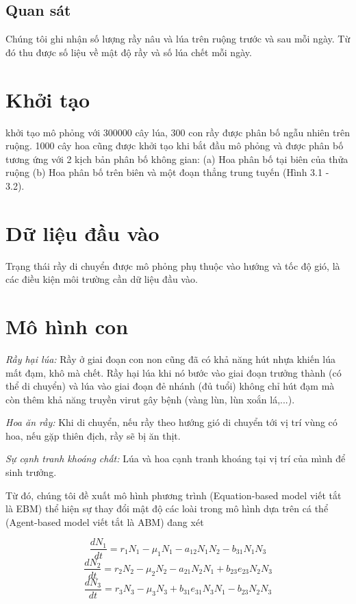 \documentclass[13pt]{extreport}
\begin{document}
{\subsection{Quan sát}
Chúng tôi ghi nhận số lượng rầy nâu và lúa trên ruộng trước và sau mỗi ngày. Từ đó thu được số liệu về mật độ rầy và số lúa chết mỗi ngày.

\section{Khởi tạo}
khởi tạo mô phỏng với 300000 cây lúa, 300 con rầy được phân bố ngẫu nhiên trên ruộng. 1000 cây hoa cũng được khởi tạo khi bắt đầu mô phỏng và được phân bố tương ứng với 2 kịch bản phân bố không gian: (a) Hoa phân bố tại biên của thửa ruộng (b) Hoa phân bố trên biên và một đoạn thẳng trung tuyến (Hình 3.1 - 3.2).

\section{Dữ liệu đầu vào}
Trạng thái rầy di chuyển được mô phỏng phụ thuộc vào hướng và tốc độ gió, là các điều kiện môi trường cần dữ liệu đầu vào.

\section{Mô hình con}
\textit{Rầy hại lúa:} Rầy ở giai đoạn con non cũng đã có khả năng hút nhựa khiến lúa mất đạm, khô mà chết. Rầy hại lúa khi nó bước vào giai đoạn trưởng thành (có thể di chuyển) và lúa vào giai đoạn đẻ nhánh (đủ tuổi) không chỉ hút đạm mà còn thêm khả năng truyền virut gây bệnh (vàng lùn, lùn xoắn lá,...).

\textit{Hoa ăn rầy:} Khi di chuyển, nếu rầy theo hướng gió di chuyển tới vị trí vùng có hoa, nếu gặp thiên địch, rầy sẽ bị ăn thịt.

\textit{Sự cạnh tranh khoáng chất:} Lúa và hoa cạnh tranh khoáng tại vị trí của mình để sinh trưởng.

Từ đó, chúng tôi đề xuất mô hình phương trình (Equation-based model viết tắt là EBM) thể hiện sự thay đổi mật độ các loài trong mô hình dựa trên cá thể (Agent-based model viết tắt là ABM) đang xét

\begin{flushleft}
\begin{equation}\label{1}
\dfrac{d N_1}{dt} = r_1 N_1 - \mu_1 N_1 - a_{12} N_1  N_2 - b_{31} N_1 N_3
\end{equation}
\begin{equation}\label{2}
\dfrac{d N_2}{dt} = r_2 N_2 - \mu_2  N_2 - a_{21} N_2 N_1 + b_{23} e_{23} N_2 N_3
\end{equation}
\begin{equation}\label{3}
\dfrac{d N_3}{dt} = r_3 N_3 - \mu_3  N_3 + b_{31} e_{31} N_3 N_1 - b_{23} N_2 N_3
\end{equation}
\end{flushleft}

}
\end{document}
